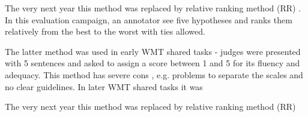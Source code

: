 The very next year this method was replaced by relative ranking method (RR) 
\citep{callison-burch-etal-2007-meta}. In this evaluation campaign, an 
annotator see five hypotheses and ranks them relatively from the best to the 
worst with ties allowed.



The latter method was used in early WMT shared tasks - judges were presented with 5 sentences and asked to assign a score between 1 and 5 for its fluency and adequacy. This method has severe cons \citep{callison-burch-etal-2007-meta}, e.g. problems to separate the scales and no clear guidelines. 
In later WMT shared tasks it was


The very next year this method was replaced by relative ranking method (RR) \citep{callison-burch-etal-2007-meta}

